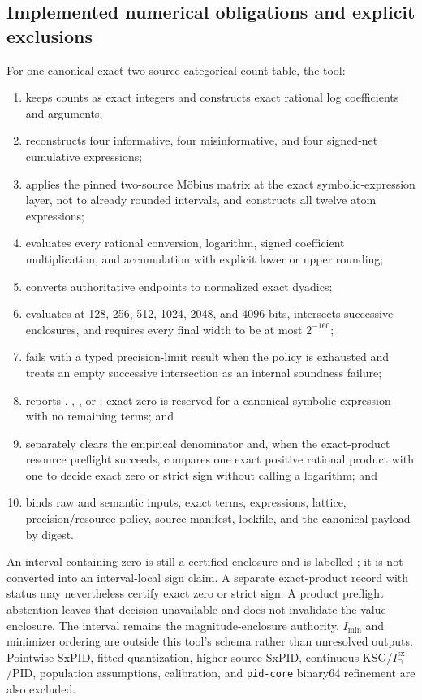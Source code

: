 \documentclass[11pt]{article}
\begin{document}
\subsection{Implemented numerical obligations and explicit exclusions}

For one canonical exact two-source categorical count table, the tool:
\begin{enumerate}[leftmargin=*]
  \item keeps counts as exact integers and constructs exact rational log coefficients and arguments;
  \item reconstructs four informative, four misinformative, and four signed-net cumulative
  expressions;
  \item applies the pinned two-source M{\"o}bius matrix at the exact symbolic-expression layer, not
  to already rounded intervals, and constructs all twelve atom expressions;
  \item evaluates every rational conversion, logarithm, signed coefficient multiplication, and
  accumulation with explicit lower or upper rounding;
  \item converts authoritative endpoints to normalized exact dyadics;
  \item evaluates at 128, 256, 512, 1024, 2048, and 4096 bits, intersects successive enclosures, and
  requires every final width to be at most \(2^{-160}\);
  \item fails with a typed precision-limit result when the policy is exhausted and treats an empty
  successive intersection as an internal soundness failure;
  \item reports , ,
  , or ; exact zero is reserved for a canonical
  symbolic expression with no remaining terms; and
  \item separately clears the empirical denominator and, when the exact-product resource preflight
  succeeds, compares one exact positive rational product with one to decide exact zero or strict
  sign without calling a logarithm; and
  \item binds raw and semantic inputs, exact terms, expressions, lattice, precision/resource policy,
  source manifest, lockfile, and the canonical payload by digest.
\end{enumerate}

An interval containing zero is still a certified enclosure and is labelled
; it is not converted into an interval-local sign claim.  A separate
exact-product record with status  may nevertheless certify exact zero or strict sign.
A product preflight abstention leaves that decision unavailable and does not invalidate the value
enclosure.  The interval remains the magnitude-enclosure authority.  \(I_{\min}\) and minimizer
ordering are outside this tool's schema rather than unresolved outputs.  Pointwise SxPID, fitted
quantization, higher-source SxPID, continuous KSG/\(I^{\mathrm{sx}}_\cap\)/PID, population
assumptions, calibration, and \texttt{pid-core} binary64 refinement are also excluded.
\end{document}
